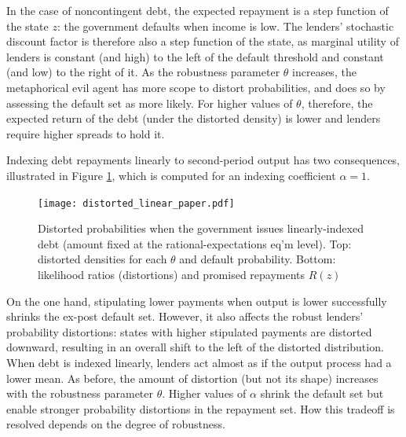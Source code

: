 In the case of noncontingent debt, the expected repayment is a step function of the state $z$: the government defaults when income is low. The lenders' stochastic discount factor is therefore also a step function of the state, as marginal utility of lenders is constant (and high) to the left of the default threshold and constant (and low) to the right of it. As the robustness parameter $\theta$ increases, the metaphorical evil agent has more scope to distort probabilities, and does so by assessing the default set as more likely. For higher values of $\theta$, therefore, the expected return of the debt (under the distorted density) is lower and lenders require higher spreads to hold it.
  
Indexing debt repayments linearly to second-period output has two consequences, illustrated in Figure \ref{Figure_distorted_linear}, which is computed for an indexing coefficient $\alpha = 1$. 
\begin{figure}[!hbtp]\centering
    \texttt{[image: distorted\_linear\_paper.pdf]}
\caption{Distorted probabilities when the government issues linearly-indexed debt (amount fixed at the rational-expectations eq'm level). Top: distorted densities for each $\theta$ and default probability. Bottom: likelihood ratios (distortions) and promised repayments $R(z)$
\label{Figure_distorted_linear}}
\end{figure}
On the one hand, stipulating lower payments when output is lower successfully shrinks the ex-post default set. However, it also affects the robust lenders' probability distortions: states with higher stipulated payments are distorted downward, resulting in an overall shift to the left of the distorted distribution. When debt is indexed linearly, lenders act almost as if the output process had a lower mean. As before, the amount of distortion (but not its shape) increases with the robustness parameter $\theta$. Higher values of $\alpha$ shrink the default set but enable stronger probability distortions in the repayment set. How this tradeoff is resolved depends on the degree of robustness.
 
